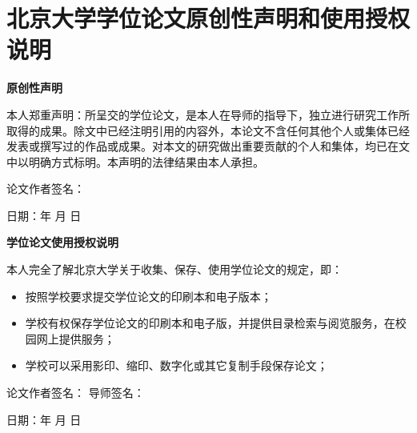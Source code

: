 \newpage
\clearpage
{}


\chapter*{北京大学学位论文原创性声明和使用授权说明}



\begin{center}
   \vspace{-20pt}
   \sihao\bfseries\centering
   原创性声明
   \vspace{10pt}
\end{center}

本人郑重声明：所呈交的学位论文，是本人在导师的指导下，独立进行研究工作所取得的成果。除文中已经注明引用的内容外，本论文不含任何其他个人或集体已经发表或撰写过的作品或成果。对本文的研究做出重要贡献的个人和集体，均已在文中以明确方式标明。本声明的法律结果由本人承担。

\vspace{30pt}

\hspace{270pt} 论文作者签名：

\hspace{270pt} 日期：\qquad \quad   年 \qquad  月 \qquad   日

\begin{center}
   \vspace{80pt}
   \sihao\bfseries\centering
   学位论文使用授权说明
   \vspace{10pt}
\end{center}



本人完全了解北京大学关于收集、保存、使用学位论文的规定，即：
\begin{itemize}
   \item 按照学校要求提交学位论文的印刷本和电子版本；
   \item 学校有权保存学位论文的印刷本和电子版，并提供目录检索与阅览服务，在校园网上提供服务；
   \item 学校可以采用影印、缩印、数字化或其它复制手段保存论文；
\end{itemize}

\vspace{30pt}

\hspace{30pt} 论文作者签名： \hspace{130pt}  导师签名：

\hspace{270pt} 日期：\qquad \quad   年 \qquad  月 \qquad   日
